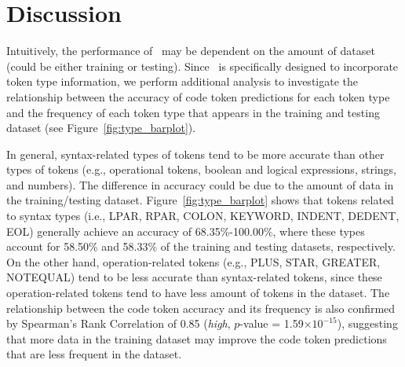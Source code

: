 \section{Discussion}
\label{sec:discussion}



Intuitively, the performance of \our~may be dependent on the amount of dataset (could be either training or testing).
Since \our~is specifically designed to incorporate token type information, we perform additional analysis to investigate the relationship between the accuracy of code token predictions for each token type and the frequency of each token type that appears in the training and testing dataset (see Figure~\ref{fig:type_barplot}).

In general, syntax-related types of tokens tend to be more accurate than other types of tokens (e.g., operational tokens, boolean and logical expressions, strings, and numbers).
The difference in accuracy could be due to the amount of data in the training/testing dataset.
Figure~\ref{fig:type_barplot} shows that tokens related to syntax types (i.e., LPAR, RPAR, COLON, KEYWORD, INDENT, DEDENT, EOL) generally achieve an accuracy of  68.35\%-100.00\%, where these types account for 58.50\% and 58.33\% of the training and testing datasets, respectively.
On the other hand, operation-related tokens (e.g., PLUS, STAR, GREATER, NOTEQUAL) tend to be less accurate than syntax-related tokens, since these operation-related tokens tend to have less amount of tokens in the dataset.
The relationship between the code token accuracy and its frequency is also confirmed by Spearman's Rank Correlation of 0.85 (\emph{high}, $p$-value = 1.59$\times10^{-15}$), suggesting that more data in the training dataset may improve the code token predictions that are less frequent in the dataset.


